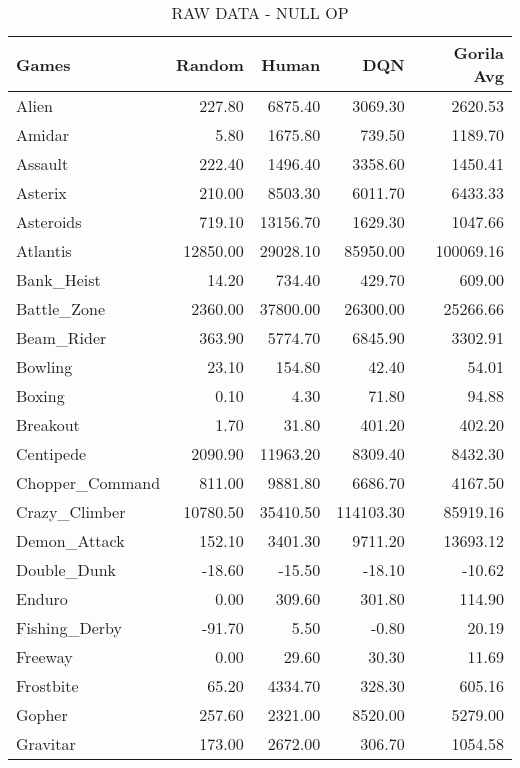 \documentclass{article}
\begin{document}
\begin{table*}[h]
	\vskip  0.5in
	\caption{RAW DATA - NULL OP}
	\centering 
	\begin{tabular}{l|r|r|r|r}
		\hline \hline
		Games & Random & Human & DQN & Gorila Avg \\
		\hline
		Alien & 227.80 & 6875.40 & 3069.30 & 2620.53 \\
		\hline
		Amidar & 5.80 & 1675.80 & 739.50 & 1189.70 \\
		\hline
		Assault & 222.40 & 1496.40 & 3358.60 & 1450.41 \\
		\hline
		Asterix & 210.00 & 8503.30 & 6011.70 & 6433.33 \\
		\hline
		Asteroids & 719.10 & 13156.70 & 1629.30 & 1047.66 \\
		\hline
		Atlantis & 12850.00 & 29028.10 & 85950.00 & 100069.16 \\
		\hline
		Bank\_Heist & 14.20 & 734.40 & 429.70 & 609.00 \\
		\hline
		Battle\_Zone & 2360.00 & 37800.00 & 26300.00 & 25266.66 \\
		\hline
		Beam\_Rider & 363.90 & 5774.70 & 6845.90 & 3302.91 \\
		\hline
		Bowling & 23.10 & 154.80 & 42.40 & 54.01 \\
		\hline
		Boxing & 0.10 & 4.30 & 71.80 & 94.88 \\
		\hline
		Breakout & 1.70 & 31.80 & 401.20 & 402.20 \\
		\hline
		Centipede & 2090.90 & 11963.20 & 8309.40 & 8432.30 \\
		\hline
		Chopper\_Command & 811.00 & 9881.80 & 6686.70 & 4167.50 \\
		\hline
		Crazy\_Climber & 10780.50 & 35410.50 & 114103.30 & 85919.16 \\
		\hline
		Demon\_Attack & 152.10 & 3401.30 & 9711.20 & 13693.12 \\
		\hline
		Double\_Dunk & -18.60 & -15.50 & -18.10 & -10.62 \\
		\hline
		Enduro & 0.00 & 309.60 & 301.80 & 114.90 \\
		\hline
		Fishing\_Derby & -91.70 & 5.50 & -0.80 & 20.19 \\
		\hline
		Freeway & 0.00 & 29.60 & 30.30 & 11.69 \\
		\hline
		Frostbite & 65.20 & 4334.70 & 328.30 & 605.16 \\
		\hline
		Gopher & 257.60 & 2321.00 & 8520.00 & 5279.00 \\
		\hline
		Gravitar & 173.00 & 2672.00 & 306.70 & 1054.58 \\

\end{tabular}
\end{table*}
\end{document}
